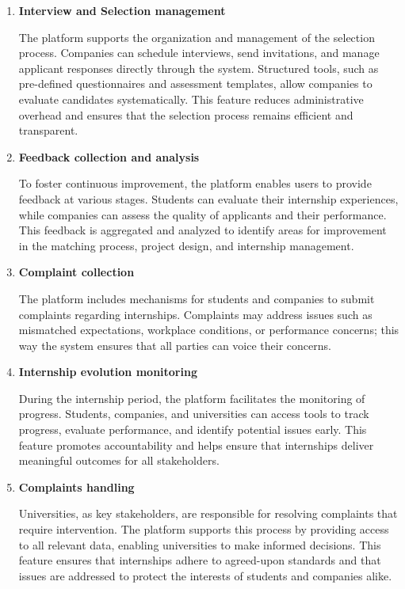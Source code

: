\begin{enumerate}
\item \textbf{Interview and Selection management}

The platform supports the organization and management of the selection process. Companies can schedule interviews, send invitations, and manage applicant responses directly through the system. Structured tools, such as pre-defined questionnaires and assessment templates, allow companies to evaluate candidates systematically. This feature reduces administrative overhead and ensures that the selection process remains efficient and transparent.

\item \textbf{Feedback collection and analysis}

To foster continuous improvement, the platform enables users to provide feedback at various stages. Students can evaluate their internship experiences, while companies can assess the quality of applicants and their performance. This feedback is aggregated and analyzed to identify areas for improvement in the matching process, project design, and internship management.

\item \textbf{Complaint collection}

The platform includes mechanisms for students and companies to submit complaints regarding internships. Complaints may address issues such as mismatched expectations, workplace conditions, or performance concerns; this way the system ensures that all parties can voice their concerns.

\item \textbf{Internship evolution monitoring}

During the internship period, the platform facilitates the monitoring of progress. Students, companies, and universities can access tools to track progress, evaluate performance, and identify potential issues early. This feature promotes accountability and helps ensure that internships deliver meaningful outcomes for all stakeholders.

\pagebreak
\item \textbf{Complaints handling}

Universities, as key stakeholders, are responsible for resolving complaints that require intervention. The platform supports this process by providing access to all relevant data, enabling universities to make informed decisions. This feature ensures that internships adhere to agreed-upon standards and that issues are addressed to protect the interests of students and companies alike.
\end{enumerate}

